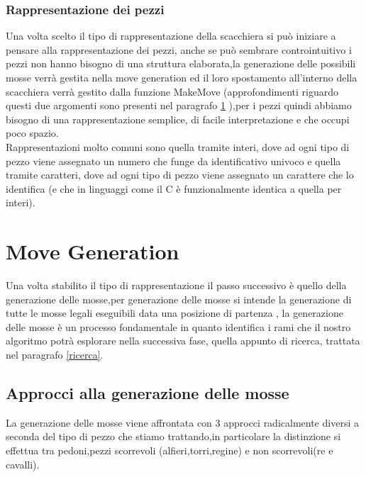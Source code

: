\subsubsection{Rappresentazione dei pezzi}
Una volta scelto il tipo di rappresentazione della scacchiera si può iniziare a pensare alla rappresentazione dei pezzi,
anche se può sembrare controintuitivo i pezzi non hanno bisogno di una struttura elaborata,la generazione delle possibili
mosse verrà gestita nella move generation ed il loro spostamento all'interno della scacchiera verrà gestito dalla funzione
MakeMove (approfondimenti riguardo questi due argomenti sono presenti nel paragrafo \ref{move generation}  ),per i pezzi quindi abbiamo bisogno di una
rappresentazione semplice, di facile interpretazione e che occupi poco spazio.\\Rappresentazioni molto comuni sono quella
tramite interi, dove ad ogni tipo di pezzo viene assegnato un numero che funge da identificativo univoco e quella tramite
caratteri, dove ad ogni tipo di pezzo viene assegnato un carattere che lo identifica (e che in linguaggi come il C è funzionalmente identica a quella per interi).


\section{Move Generation}
\label{move generation} %
%
Una volta stabilito il tipo di rappresentazione il passo successivo è quello della generazione delle mosse,per generazione delle mosse si intende la generazione
di tutte le mosse legali eseguibili data una posizione di partenza , la generazione delle mosse è un processo fondamentale in quanto identifica i rami che
il nostro algoritmo potrà esplorare nella successiva fase, quella appunto di ricerca, trattata nel paragrafo \ref{ricerca}.



\subsection{Approcci alla generazione delle mosse}
La generazione delle mosse viene affrontata con 3 approcci radicalmente diversi a seconda del tipo di pezzo che stiamo trattando,in particolare la distinzione si effettua tra 
pedoni,pezzi scorrevoli (alfieri,torri,regine) e non scorrevoli(re e cavalli).

